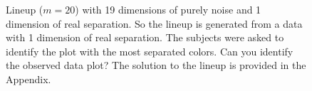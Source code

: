 %
\begin{figure}[hbtp]
   \centering
       \caption{Lineup  ($m=20$) with 19 dimensions of purely noise  and 1 dimension of real separation. So the lineup is generated from a data with 1 dimension of real separation. The subjects were asked to identify the plot with the most separated colors. Can you identify the observed data plot? The solution to the lineup is provided in the Appendix. }
     \label{fig:test_category_1d}
\end{figure}
%
%

